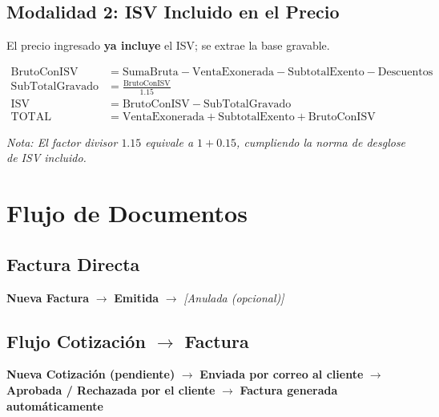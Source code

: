 \documentclass[12pt, letterpaper]{article}
\begin{document}
\subsection{Modalidad 2: ISV Incluido en el Precio}

El precio ingresado \textbf{ya incluye} el ISV; se extrae la base gravable.

\begin{align}
  \text{BrutoConISV}       &= \text{SumaBruta} - \text{VentaExonerada}
                              - \text{SubtotalExento} - \text{Descuentos}             \\
  \text{SubTotalGravado}   &= \frac{\text{BrutoConISV}}{1.15}                         \\
  \text{ISV}               &= \text{BrutoConISV} - \text{SubTotalGravado}             \\
  \text{TOTAL}             &= \text{VentaExonerada} + \text{SubtotalExento}
                              + \text{BrutoConISV}
\end{align}

\textit{Nota: El factor divisor $1.15$ equivale a $1 + 0.15$, cumpliendo
la norma de desglose de ISV incluido.}

\section{Flujo de Documentos}

\subsection{Factura Directa}

\begin{center}
  \textbf{Nueva Factura} $\longrightarrow$ \textbf{Emitida}
  $\longrightarrow$ \textit{[Anulada (opcional)]}
\end{center}

\subsection{Flujo Cotización \texorpdfstring{$\rightarrow$}{→} Factura}

\begin{center}
  \textbf{Nueva Cotización (pendiente)}
  $\longrightarrow$ \textbf{Enviada por correo al cliente}
  $\longrightarrow$ \textbf{Aprobada / Rechazada por el cliente}
  $\longrightarrow$ \textbf{Factura generada automáticamente}
\end{center}
\end{document}
